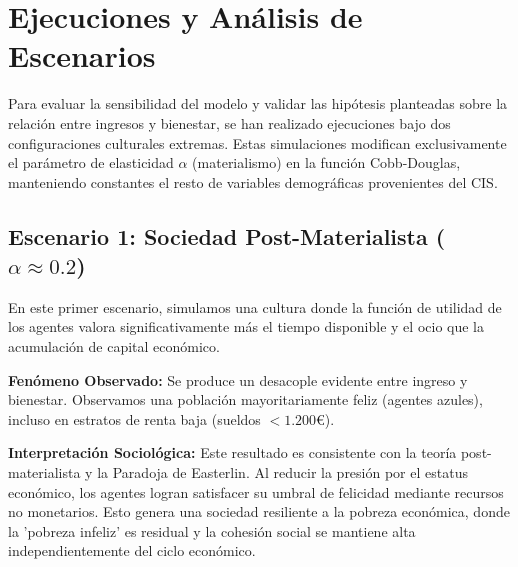 \documentclass[a4paper,12pt]{article}
\begin{document}
\newpage


\section{Ejecuciones y Análisis de Escenarios}

Para evaluar la sensibilidad del modelo y validar las hipótesis planteadas sobre la relación entre ingresos y bienestar, se han realizado ejecuciones bajo dos configuraciones culturales extremas. Estas simulaciones modifican exclusivamente el parámetro de elasticidad $\alpha$ (materialismo) en la función Cobb-Douglas, manteniendo constantes el resto de variables demográficas provenientes del CIS.

\newpage

\subsection{Escenario 1: Sociedad Post-Materialista ($\alpha \approx 0.2$)}

En este primer escenario, simulamos una cultura donde la función de utilidad de los agentes valora significativamente más el tiempo disponible y el ocio que la acumulación de capital económico.

\textbf{Fenómeno Observado:} Se produce un desacople evidente entre ingreso y bienestar. Observamos una población mayoritariamente feliz (agentes azules), incluso en estratos de renta baja (sueldos $< 1.200$\euro).

\textbf{Interpretación Sociológica:} Este resultado es consistente con la teoría post-materialista y la Paradoja de Easterlin. Al reducir la presión por el estatus económico, los agentes logran satisfacer su umbral de felicidad mediante recursos no monetarios. Esto genera una sociedad resiliente a la pobreza económica, donde la 'pobreza infeliz' es residual y la cohesión social se mantiene alta independientemente del ciclo económico.
\end{document}
